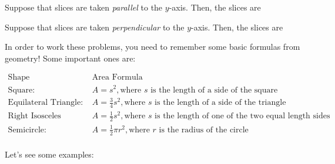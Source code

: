 \documentclass{ximera}
\begin{document}
\begin{exercise}
Suppose that slices are taken \emph{parallel} to the $y$-axis.  Then, the slices are
\begin{multipleChoice}
\end{multipleChoice}

Suppose that slices are taken \emph{perpendicular} to the $y$-axis.  Then, the slices are
\begin{multipleChoice}
\end{multipleChoice}
\end{exercise}

\begin{remark}
In order to work these problems, you need to remember some basic formulas from geometry!  Some important ones are:

\[
\begin{array}{ll}
\textrm{Shape} & \textrm{Area Formula} \\ [2 ex]
\textrm{Square:} & A=s^2, \textrm{where } s \textrm{ is the length of a side of the square} \\ [2 ex]
\textrm{Equilateral Triangle:} & A=\frac{3}{4} s^2, \textrm{where } s \textrm{ is the length of a side of the triangle} \\ [2 ex]
\textrm{Right Isosceles Triangle:} & A=\frac{1}{2} s^2, \textrm{where } s \textrm{ is the length of one of the two equal length sides} \\ [2 ex]
\textrm{Semicircle:} & A=\frac{1}{2} \pi r^2, \textrm{where } r \textrm{ is the radius of the circle} \\
\end{array}
\]

\end{remark}




Let's see some examples:
\end{document}
